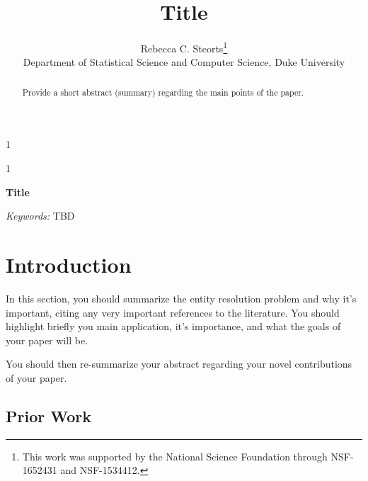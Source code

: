 \documentclass[12pt]{article}\usepackage[]{graphicx}\usepackage[]{color}
\newcommand{\blind}{1}
\begin{document}
\def\spacingset#1{\renewcommand{\baselinestretch}%
{#1}\small\normalsize} \spacingset{1}




\blind
{
  \title{\bf Title}
  \author{Rebecca C. Steorts\thanks{
    This work was supported by the National Science Foundation through NSF-1652431 and NSF-1534412.}\hspace{.2cm}\\
    Department of Statistical Science and Computer Science, Duke University}
  \maketitle
} \fi

\blind
{
  \bigskip
  \bigskip
  \bigskip
  \begin{center}
    {\LARGE\bf Title}
\end{center}
  \medskip
} \fi

\bigskip

\begin{abstract}
Provide a short abstract (summary) regarding the main points of the paper. 
\end{abstract}

\noindent%
{\it Keywords:}  TBD
\vfill

\newpage



\section{Introduction}
\label{sec:intro}

In this section, you should summarize the entity resolution problem and why it's important, citing any very important references to the literature. You should highlight briefly you main application, it's importance, and what the goals of your paper will be. 

You should then re-summarize your abstract regarding your novel contributions of your paper. 

\subsection{Prior Work}
\end{document}
